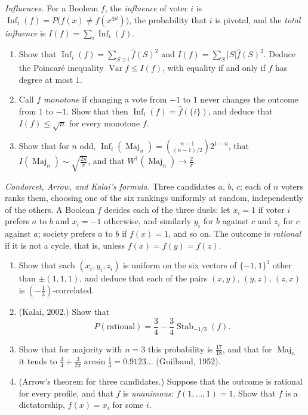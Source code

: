 \begin{exercise}[$\star\star$]\label{pb:influence}
\emph{Influences.} For a Boolean $f$, the \emph{influence} of voter $i$ is $\operatorname{Inf}_i(f)=P\bigl(f(x)\ne f(x^{\oplus i})\bigr)$, the probability that $i$ is
pivotal, and the \emph{total influence} is $I(f)=\sum_i\operatorname{Inf}_i(f)$.
\begin{enumerate}[label=(\alph*)]
\item Show that $\operatorname{Inf}_i(f)=\sum_{S\ni i}\hat f(S)^2$ and $I(f)=\sum_S|S|\hat f(S)^2$. Deduce the Poincaré inequality $\operatorname{Var}f\le I(f)$, with
equality if and only if $f$ has degree at most $1$.
\item Call $f$ \emph{monotone} if changing a vote from $-1$ to $1$ never changes the outcome from $1$ to $-1$. Show that then
$\operatorname{Inf}_i(f)=\hat f(\{i\})$, and deduce that $I(f)\le\sqrt n$ for every monotone $f$.
\item Show that for $n$ odd, $\operatorname{Inf}_i(\operatorname{Maj}_n)=\binom{n-1}{(n-1)/2}2^{1-n}$, that $I(\operatorname{Maj}_n)\sim\sqrt{\frac{2n}\pi}$, and that $W^1(\operatorname{Maj}_n)\to\frac2\pi$.
\end{enumerate}
\end{exercise}

\begin{exercise}[$\star\star\star$]\label{pb:arrow}
\emph{Condorcet, Arrow, and Kalai's formula.} Three candidates $a$, $b$, $c$; each of $n$ voters ranks them, choosing one of the six
rankings uniformly at random, independently of the others. A Boolean $f$ decides each of the three duels: let $x_i=1$ if voter $i$
prefers $a$ to $b$ and $x_i=-1$ otherwise, and similarly $y_i$ for $b$ against $c$ and $z_i$ for $c$ against $a$; society prefers $a$ to
$b$ if $f(x)=1$, and so on. The outcome is \emph{rational} if it is not a cycle, that is, unless $f(x)=f(y)=f(z)$.
\begin{enumerate}[label=(\alph*)]
\item Show that each $(x_i,y_i,z_i)$ is uniform on the six vectors of $\{-1,1\}^3$ other than $\pm(1,1,1)$, and deduce that each of the
pairs $(x,y)$, $(y,z)$, $(z,x)$ is $(-\frac13)$-correlated.
\item (Kalai, 2002.) Show that
\[
P(\text{rational})=\frac34-\frac34\operatorname{Stab}_{-1/3}(f).
\]
\item Show that for majority with $n=3$ this probability is $\frac{17}{18}$, and that for $\operatorname{Maj}_n$ it tends to
$\frac34+\frac3{2\pi}\arcsin\frac13=0.9123\ldots$ (Guilbaud, 1952).
\item (Arrow's theorem for three candidates.) Suppose that the outcome is rational for every profile, and that $f$ is
\emph{unanimous}: $f(1,\dots,1)=1$. Show that $f$ is a dictatorship, $f(x)=x_i$ for some $i$.
\end{enumerate}
\end{exercise}

